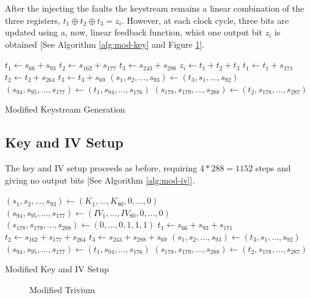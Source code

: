\documentclass[conference]{IEEEtran}
\begin{document}
After the injecting the faults the keystream remains a linear combination of the three registers, $t_1 \oplus t_2 \oplus t_3 = z_i$. However, at each clock cycle, three bits are updated using a, now, linear feedback function, whist one output bit $z_i$ is obtained [See Algorithm \ref{alg:mod-key} and Figure \ref{fig:modified}].

\begin{algorithm}[H]
\begin{algorithmic}[1]
 
\State $t_1 \gets s_{66} + s_{93}$
\State $t_2 \gets s_{162} + s_{177}$
\State $t_3 \gets s_{243} + s_{288}$
\State
\State $z_i \gets t_1 + t_2 + t_3$
\State
\State $t_1 \gets t_1 + s_{171}$
\State $t_2 \gets t_2 + s_{264}$
\State $t_3 \gets t_3 + s_{69}$
\State
\State $(s_1,s_2,\dots,s_{93}) \gets (t_3,s_1,\dots,s_{92})$
\State $(s_{94},s_{95},\dots,s_{177}) \gets (t_1,s_{94},\dots,s_{176})$
\State $(s_{178},s_{179},\dots,s_{288}) \gets (t_2,s_{178},\dots,s_{287})$
\EndFor
\end{algorithmic}
\caption{Modified Keystream Generation} \label{alg:mod-key}
\end{algorithm}

\subsection{Key and IV Setup}

The key and IV setup proceeds as before, requiring $4*288=1152$ steps and giving no output bits [See Algorithm \ref{alg:mod-iv}].

\begin{algorithm}[H]
\begin{algorithmic}[1]
\State $(s_1,s_2,\dots,s_{93}) \gets (K_1,\dots,K_{80},0,\dots,0)$
\State $(s_{94},s_{95},\dots,s_{177}) \gets (IV_1,\dots,IV_{80},0,\dots,0)$
\State $(s_{178},s_{179},\dots,s_{288}) \gets (0,\dots,0,1,1,1)$
\State
{}
\State $t_1 \gets s_{66} + s_{93} + s_{171}$
\State $t_2 \gets s_{162} + s_{177} + s_{264}$
\State $t_3 \gets s_{243} + s_{288}+ s_{69}$
\State
\State $(s_1,s_2,\dots,s_{93}) \gets (t_3,s_1,\dots,s_{92})$
\State $(s_{94},s_{95},\dots,s_{177}) \gets (t_1,s_{94},\dots,s_{176})$
\State $(s_{178},s_{179},\dots,s_{288}) \gets (t_2,s_{178},\dots,s_{287})$
\EndFor
\end{algorithmic}
\caption{Modified Key and IV Setup} \label{alg:mod-iv}
\end{algorithm}

\begin{figure}[H]
\centering

\caption{Modified Trivium}
\label{fig:modified}
\end{figure}
\end{document}
